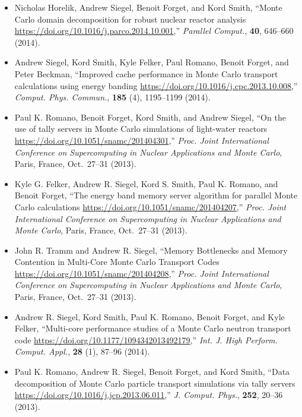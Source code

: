 \begin{itemize}
\item Nicholas Horelik, Andrew Siegel, Benoit Forget, and Kord Smith, ``Monte Carlo
domain decomposition for robust nuclear reactor analysis
\url{https://doi.org/10.1016/j.parco.2014.10.001},'' \textit{Parallel Comput.},
\textbf{40}, 646--660 (2014).

\item Andrew Siegel, Kord Smith, Kyle Felker, Paul Romano, Benoit Forget, and Peter
Beckman, ``Improved cache performance in Monte Carlo transport calculations
using energy banding \url{https://doi.org/10.1016/j.cpc.2013.10.008},''
\textit{Comput. Phys. Commun.}, \textbf{185} (4), 1195--1199 (2014).

\item Paul K. Romano, Benoit Forget, Kord Smith, and Andrew Siegel, ``On the use of
tally servers in Monte Carlo simulations of light-water reactors
\url{https://doi.org/10.1051/snamc/201404301},'' \textit{Proc. Joint International
Conference on Supercomputing in Nuclear Applications and Monte Carlo}, Paris,
France, Oct.\ 27--31 (2013).

\item Kyle G. Felker, Andrew R. Siegel, Kord S. Smith, Paul K. Romano, and Benoit
Forget, ``The energy band memory server algorithm for parallel Monte Carlo
calculations \url{https://doi.org/10.1051/snamc/201404207},'' \textit{Proc. Joint
International Conference on Supercomputing in Nuclear Applications and Monte
Carlo}, Paris, France, Oct.\ 27--31 (2013).

\item John R. Tramm and Andrew R. Siegel, ``Memory Bottlenecks and Memory Contention
in Multi-Core Monte Carlo Transport Codes
\url{https://doi.org/10.1051/snamc/201404208},'' \textit{Proc. Joint International
Conference on Supercomputing in Nuclear Applications and Monte Carlo}, Paris,
France, Oct.\ 27--31 (2013).

\item Andrew R. Siegel, Kord Smith, Paul K. Romano, Benoit Forget, and Kyle Felker,
``Multi-core performance studies of a Monte Carlo neutron transport code
\url{https://doi.org/10.1177/1094342013492179},'' \textit{Int. J. High
Perform. Comput. Appl.}, \textbf{28} (1), 87--96 (2014).

\item Paul K. Romano, Andrew R. Siegel, Benoit Forget, and Kord Smith, ``Data
decomposition of Monte Carlo particle transport simulations via tally servers
\url{https://doi.org/10.1016/j.jcp.2013.06.011},'' \textit{J. Comput. Phys.}, \textbf{252},
20--36 (2013).


\end{itemize}
